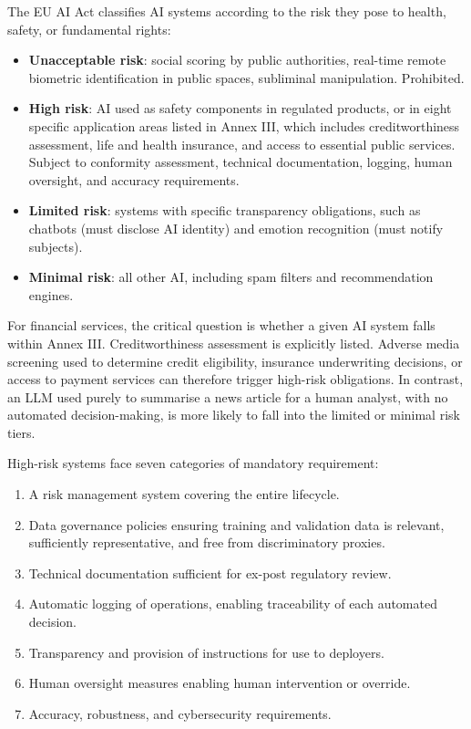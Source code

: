 \begin{definition}
\label{def:eu-ai-act-tiers}
The EU AI Act classifies AI systems according to the risk they pose to health, safety, or fundamental rights:
\begin{itemize}
  \item \textbf{Unacceptable risk}: social scoring by public authorities, real-time remote biometric identification in public spaces, subliminal manipulation. Prohibited.
  \item \textbf{High risk}: AI used as safety components in regulated products, or in eight specific application areas listed in Annex III, which includes creditworthiness assessment, life and health insurance, and access to essential public services. Subject to conformity assessment, technical documentation, logging, human oversight, and accuracy requirements.
  \item \textbf{Limited risk}: systems with specific transparency obligations, such as chatbots (must disclose AI identity) and emotion recognition (must notify subjects).
  \item \textbf{Minimal risk}: all other AI, including spam filters and recommendation engines.
\end{itemize}
\end{definition}

For financial services, the critical question is whether a given AI system falls within Annex III. Creditworthiness assessment is explicitly listed. Adverse media screening used to determine credit eligibility, insurance underwriting decisions, or access to payment services can therefore trigger high-risk obligations. In contrast, an LLM used purely to summarise a news article for a human analyst, with no automated decision-making, is more likely to fall into the limited or minimal risk tiers.

High-risk systems face seven categories of mandatory requirement:
\begin{enumerate}
  \item A risk management system covering the entire lifecycle.
  \item Data governance policies ensuring training and validation data is relevant, sufficiently representative, and free from discriminatory proxies.
  \item Technical documentation sufficient for ex-post regulatory review.
  \item Automatic logging of operations, enabling traceability of each automated decision.
  \item Transparency and provision of instructions for use to deployers.
  \item Human oversight measures enabling human intervention or override.
  \item Accuracy, robustness, and cybersecurity requirements.
\end{enumerate}

